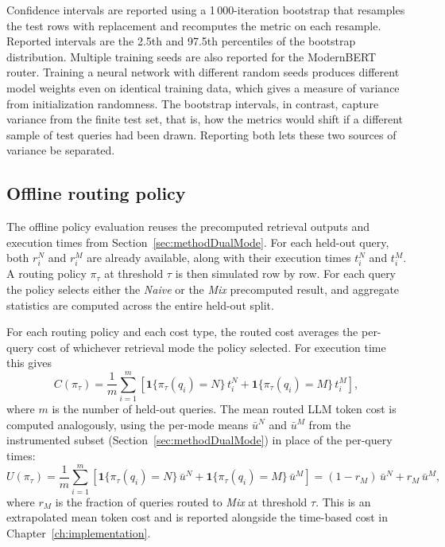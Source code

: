 \documentclass[english, bibtex]{kththesis}               %
\numberwithin{listing}{chapter}
\begin{document}
Confidence intervals are reported using a 1\,000-iteration bootstrap that resamples the test rows with replacement and recomputes the metric on each resample. Reported intervals are the 2.5th and 97.5th percentiles of the bootstrap distribution. Multiple training seeds are also reported for the ModernBERT router. Training a neural network with different random seeds produces different model weights even on identical training data, which gives a measure of variance from initialization randomness. The bootstrap intervals, in contrast, capture variance from the finite test set, that is, how the metrics would shift if a different sample of test queries had been drawn. Reporting both lets these two sources of variance be separated.

\subsection{Offline routing policy}
\label{sec:methodOfflinePolicy}

The offline policy evaluation reuses the precomputed retrieval outputs and execution times from Section~\ref{sec:methodDualMode}. For each held-out query, both \(r_i^N\) and \(r_i^M\) are already available, along with their execution times \(t_i^N\) and \(t_i^M\). A routing policy \(\pi_\tau\) at threshold \(\tau\) is then simulated row by row. For each query the policy selects either the \emph{Naive} or the \emph{Mix} precomputed result, and aggregate statistics are computed across the entire held-out split.

For each routing policy and each cost type, the routed cost averages the per-query cost of whichever retrieval mode the policy selected. For execution time this gives
\begin{equation}
\label{eq:averageRoutedTime}
C(\pi_\tau) =
\frac{1}{m}\sum_{i=1}^{m}
\left[
\mathbf{1}\{\pi_\tau(q_i)=N\}\,t_i^N
+ \mathbf{1}\{\pi_\tau(q_i)=M\}\,t_i^M
\right],
\end{equation}
where \(m\) is the number of held-out queries. The mean routed LLM token cost is computed analogously, using the per-mode means $\bar{u}^N$ and $\bar{u}^M$ from the instrumented subset (Section~\ref{sec:methodDualMode}) in place of the per-query times:
\begin{equation}
\label{eq:averageRoutedTokens}
U(\pi_\tau) =
\frac{1}{m}\sum_{i=1}^{m}
\left[
\mathbf{1}\{\pi_\tau(q_i)=N\}\,\bar{u}^N
+ \mathbf{1}\{\pi_\tau(q_i)=M\}\,\bar{u}^M
\right]
= (1 - r_M)\,\bar{u}^N + r_M\,\bar{u}^M,
\end{equation}
where \(r_M\) is the fraction of queries routed to \emph{Mix} at threshold \(\tau\). This is an extrapolated mean token cost and is reported alongside the time-based cost in Chapter~\ref{ch:implementation}.
\end{document}
